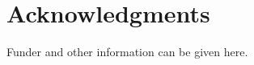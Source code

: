 \documentclass[9pt]{livecoms}
\begin{document}

\section{Acknowledgments}

Funder and other information can be given here.



\end{document}
